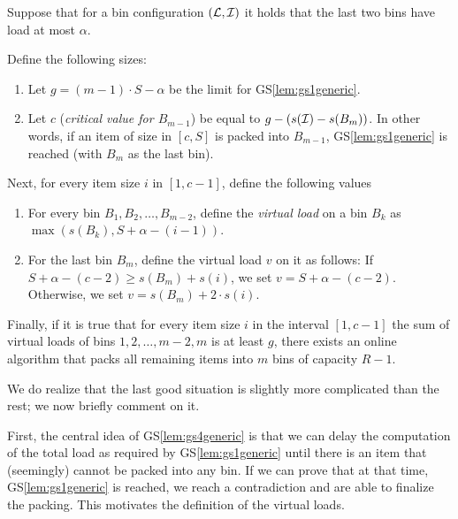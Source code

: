 \begin{goodsit}\label{lem:gs4generic}

Suppose that for a bin configuration $({\mathcal L}, {\mathcal I})$ it holds that
the last two bins have load at most $\alpha$. 

Define the following sizes:

\begin{enumerate}
\item Let $g = (m-1)\cdot S - \alpha$ be the limit for GS\ref{lem:gs1generic}.
\item Let $c$ (\emph{critical value for $B_{m-1}$}) be equal to $g - (s({\mathcal I}) - s(B_m))$.
In other words, if an item of size in $[c,S]$ is packed into $B_{m-1}$, GS\ref{lem:gs1generic}
is reached (with $B_{m}$ as the last bin).
\end{enumerate}

Next, for every item size $i$ in $[1,c-1]$, define the following values

\begin{enumerate}

\item For every bin $B_1, B_2, \ldots, B_{m-2}$, define the
\emph{virtual load} on a bin $B_k$ as $\max(s(B_k), S+\alpha - (i-1))$.

\item For the last bin $B_m$, define the virtual load $v$ on it
as follows: If $S+\alpha - (c-2) \ge s(B_m) + s(i)$, we set $v = S + \alpha - (c-2)$.
Otherwise, we set $v = s(B_m) + 2\cdot s(i)$.
\end{enumerate}

Finally, if it is true that for every item size $i$ in the interval
$[1,c-1]$ the sum of virtual loads of bins $1,2,\ldots, m-2, m$ is at
least $g$, there exists an online algorithm that packs all remaining
items into $m$ bins of capacity $R-1$.

\end{goodsit}

We do realize that the last good situation is slightly more
complicated than the rest; we now briefly comment on it.

First, the central idea of GS\ref{lem:gs4generic} is that we can delay
the computation of the total load as required by
GS\ref{lem:gs1generic} until there is an item that (seemingly) cannot
be packed into any bin. If we can prove that at that time,
GS\ref{lem:gs1generic} is reached, we reach a contradiction and are
able to finalize the packing. This motivates the definition of the
virtual loads.


